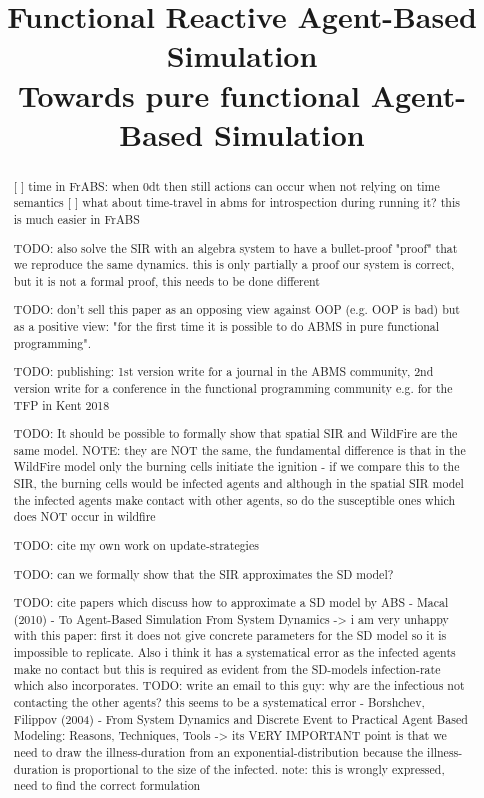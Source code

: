 \documentclass[10pt, conference]{../../templates/IEEEtran/IEEEtran}
\title{Functional Reactive Agent-Based Simulation\\{\subtitlefont Towards pure functional Agent-Based Simulation}}
\author{
	\IEEEauthorblockN{Jonathan Thaler}
	\IEEEauthorblockA{School of Computer Science\\
		University of Nottingham\\
		jonathan.thaler@nottingham.ac.uk}
		
	\and
		
	\IEEEauthorblockN{Peer-Olaf Siebers}
	\IEEEauthorblockA{School of Computer Science\\
		University of Nottingham\\
		peer-olaf.siebers@nottingham.ac.uk}
		
	\and
		
	\IEEEauthorblockN{Thorsten Altenkirch}
	\IEEEauthorblockA{School of Computer Science\\
		University of Nottingham\\
		thorsten.altenkirch@nottingham.ac.uk}
}
\begin{document}
\maketitle 

\begin{abstract}


[ ] time in FrABS: when 0dt then still actions can occur when not relying on time semantics
[ ] what about time-travel in abms for introspection during running it? this is much easier in FrABS

TODO: also solve the SIR with an algebra system to have a bullet-proof "proof" that we reproduce the same dynamics. this is only partially a proof our system is correct, but it is not a formal proof, this needs to be done different

TODO: don't sell this paper as an opposing view against OOP (e.g. OOP is bad) but as a positive view: "for the first time it is possible to do ABMS in pure functional programming".

TODO: publishing: 1st version write for a journal in the ABMS community, 2nd version write for a conference in the functional programming community e.g. for the TFP in Kent 2018

TODO: It should be possible to formally show that spatial SIR and WildFire are the same model. NOTE: they are NOT the same, the fundamental difference is that in the WildFire model only the burning cells initiate the ignition - if we compare this to the SIR, the burning cells would be infected agents and although in the spatial SIR model the infected agents make contact with other agents, so do the susceptible ones which does NOT occur in wildfire

TODO: cite my own work on update-strategies

TODO: can we formally show that the SIR approximates the SD model?

TODO: cite papers which discuss how to approximate a SD model by ABS
- Macal (2010) - To Agent-Based Simulation From System Dynamics 
	-> i am very unhappy with this paper: first it does not give concrete parameters for the SD model so it is impossible to replicate. Also i think it has a systematical error as the infected agents make no contact but this is required as evident from the SD-models infection-rate which also incorporates. TODO: write an email to this guy: why are the infectious not contacting the other agents? this seems to be a systematical error
- Borshchev, Filippov (2004) - From System Dynamics and Discrete Event to Practical Agent Based Modeling: Reasons, Techniques, Tools
	-> its VERY IMPORTANT point is that we need to draw the illness-duration from an exponential-distribution because the illness-duration is proportional to the size of the infected. note: this is wrongly expressed, need to find the correct formulation


\end{abstract}
\end{document}
